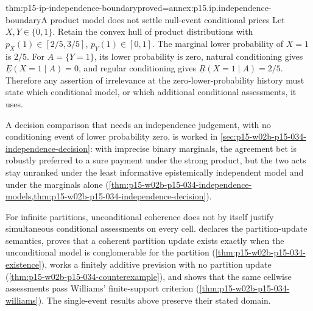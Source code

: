 \begin{hbtheorem}{thm:p15-ip-independence-boundary}{proved=annex:p15.ip.independence-boundary}{A product model does not settle null-event conditional prices}
Let \(X,Y\in\{0,1\}\). Retain the convex hull of product distributions
with \(p_X(1)\in[2/5,3/5]\), \(p_Y(1)\in[0,1]\).
The marginal lower probability of \(X=1\) is \(2/5\).
For \(A=\{Y=1\}\), its lower probability is zero, natural conditioning
gives \(\underline E(X=1\mid A)=0\), and regular conditioning gives
\(\underline R(X=1\mid A)=2/5\). Therefore any assertion of
irrelevance at the zero-lower-probability history must state which
conditional model, or which additional conditional assessments, it uses.
\end{hbtheorem}

A decision comparison that needs an independence judgement, with no
conditioning event of lower probability zero, is worked in
\cref{sec:p15-w02b-p15-034-independence-decision}: with imprecise binary
marginals, the agreement bet is robustly preferred to a sure payment under
the strong product, but the two acts stay unranked under the least
informative epistemically independent model and under the marginals alone
(\cref{thm:p15-w02b-p15-034-independence-models,thm:p15-w02b-p15-034-independence-decision}).

For infinite partitions, unconditional coherence does not by itself
justify simultaneous conditional assessments on every cell.
 declares the
partition-update semantics, proves that a coherent partition update exists
exactly when the unconditional model is conglomerable for the partition
(\cref{thm:p15-w02b-p15-034-existence}), works a finitely additive
prevision with no partition update
(\cref{thm:p15-w02b-p15-034-counterexample}), and shows that the same
cellwise assessments pass Williams' finite-support criterion
(\cref{thm:p15-w02b-p15-034-williams}). The single-event results above
preserve their stated domain.
